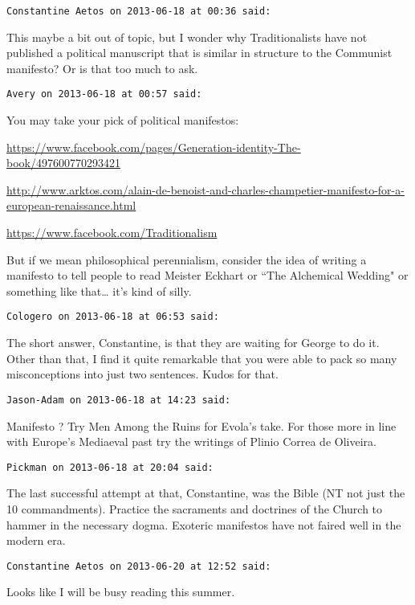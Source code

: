 \begin{footnotesize}
\begin{sffamily}
\hfill

\texttt{Constantine Aetos on 2013-06-18 at 00:36 said: }

This maybe a bit out of topic, but I wonder why Traditionalists have not published a political manuscript that is similar in structure to the Communist manifesto? Or is that too much to ask.


\hfill

\texttt{Avery on 2013-06-18 at 00:57 said: }

You may take your pick of political manifestos: 

\url{https://www.facebook.com/pages/Generation-identity-The-book/497600770293421}

\url{http://www.arktos.com/alain-de-benoist-and-charles-champetier-manifesto-for-a-european-renaissance.html}

\url{https://www.facebook.com/Traditionalism}

But if we mean philosophical perennialism, consider the idea of writing a manifesto to tell people to read Meister Eckhart or ``The Alchemical Wedding" or something like that… it's kind of silly.


\hfill

\texttt{Cologero on 2013-06-18 at 06:53 said: }

The short answer, Constantine, is that they are waiting for George to do it. Other than that, I find it quite remarkable that you were able to pack so many misconceptions into just two sentences. Kudos for that.


\hfill

\texttt{Jason-Adam on 2013-06-18 at 14:23 said: }

Manifesto ? Try Men Among the Ruins for Evola's take. For those more in line with Europe's Mediaeval past try the writings of Plinio Correa de Oliveira.


\hfill

\texttt{Pickman on 2013-06-18 at 20:04 said: }

The last successful attempt at that, Constantine, was the Bible (NT not just the 10 commandments). Practice the sacraments and doctrines of the Church to hammer in the necessary dogma. Exoteric manifestos have not faired well in the modern era.


\hfill

\texttt{Constantine Aetos on 2013-06-20 at 12:52 said: }

Looks like I will be busy reading this summer.


\hfill


\end{sffamily}
\end{footnotesize}
